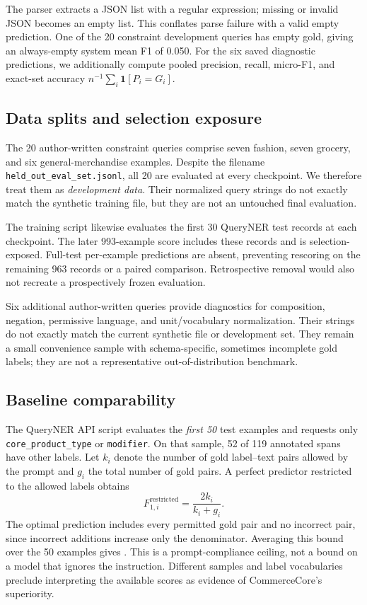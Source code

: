 \documentclass{article}
\newcommand{\code}[1]{\texttt{#1}}
\begin{document}
The parser extracts a JSON list with a regular expression; missing or invalid JSON becomes an empty list. This conflates parse failure with a valid empty prediction. One of the 20 constraint development queries has empty gold, giving an always-empty system mean F1 of 0.050. For the six saved diagnostic predictions, we additionally compute pooled precision, recall, micro-F1, and exact-set accuracy $n^{-1}\sum_i\mathbf{1}[P_i=G_i]$.

\subsection{Data splits and selection exposure}
The 20 author-written constraint queries comprise seven fashion, seven grocery, and six general-merchandise examples. Despite the filename \code{held\_out\_eval\_set.jsonl}, all 20 are evaluated at every checkpoint. We therefore treat them as \emph{development data}. Their normalized query strings do not exactly match the synthetic training file, but they are not an untouched final evaluation.

The training script likewise evaluates the first 30 QueryNER test records at each checkpoint. The later 993-example score includes these records and is selection-exposed. Full-test per-example predictions are absent, preventing rescoring on the remaining 963 records or a paired comparison. Retrospective removal would also not recreate a prospectively frozen evaluation.

Six additional author-written queries provide diagnostics for composition, negation, permissive language, and unit/vocabulary normalization. Their strings do not exactly match the current synthetic file or development set. They remain a small convenience sample with schema-specific, sometimes incomplete gold labels; they are not a representative out-of-distribution benchmark.

\subsection{Baseline comparability}
The QueryNER API script evaluates the \emph{first 50} test examples and requests only \code{core\_product\_type} or \code{modifier}. On that sample, 52 of 119 annotated spans have other labels. Let $k_i$ denote the number of gold label--text pairs allowed by the prompt and $g_i$ the total number of gold pairs. A perfect predictor restricted to the allowed labels obtains
\begin{equation}
 F^{\mathrm{restricted}}_{1,i}=\frac{2k_i}{k_i+g_i}.
\end{equation}
The optimal prediction includes every permitted gold pair and no incorrect pair, since incorrect additions increase only the denominator. Averaging this bound over the 50 examples gives \RestrictedPromptCeiling{}. This is a prompt-compliance ceiling, not a bound on a model that ignores the instruction. Different samples and label vocabularies preclude interpreting the available scores as evidence of CommerceCore's superiority.
\end{document}
